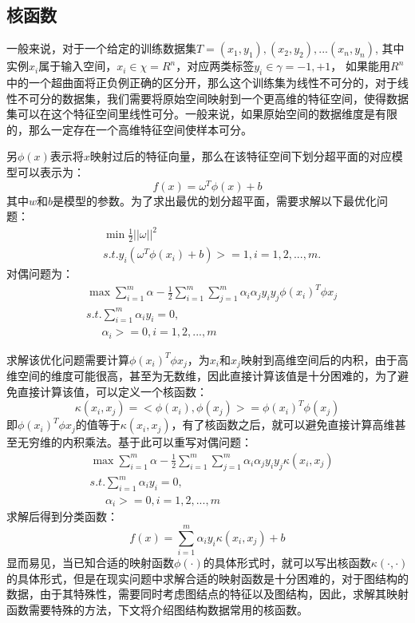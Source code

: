 \subsection{核函数}
\par 一般来说，对于一个给定的训练数据集$T={(x_1, y_1), (x_2, y_2), ...(x_n, y_n)}$, 其中实例$x_i$属于输入空间，$x_i\in \chi=R^n$，对应两类标签$y_i\in \gamma={-1, +1}$， 如果能用$R^n$中的一个超曲面将正负例正确的区分开，那么这个训练集为线性不可分的，对于线性不可分的数据集，我们需要将原始空间映射到一个更高维的特征空间，使得数据集可以在这个特征空间里线性可分。一般来说，如果原始空间的数据维度是有限的，那么一定存在一个高维特征空间使样本可分。
\par 另$\phi(x)$表示将$x$映射过后的特征向量，那么在该特征空间下划分超平面的对应模型可以表示为：
$$f(x)=\omega^T\phi(x)+b$$
其中$w$和$b$是模型的参数。为了求出最优的划分超平面，需要求解以下最优化问题：
\begin{align}
&\min \frac{1}{2} ||\omega||^2 \\
&s.t. y_i(\omega^T\phi(x_i)+b)>=1, i=1,2,...,m.
\end{align}
对偶问题为：
\begin{align}
&\max \sum_{i=1}^{m} \alpha - \frac{1}{2}\sum_{i=1}^{m}\sum_{j=1}^{m} \alpha_i\alpha_jy_iy_j\phi(x_i)^T\phi{x_j}\\
&s.t. \sum_{i=1}^m \alpha_i y_i = 0,\\
&\phantom {s.t.}\alpha_i >=0,  i=1,2,...,m
\end{align}
\par 	求解该优化问题需要计算$\phi(x_i)^T\phi{x_j}$，为$x_i$和$x_j$映射到高维空间后的内积，由于高维空间的维度可能很高，甚至为无数维，因此直接计算该值是十分困难的，为了避免直接计算该值，可以定义一个核函数：
\begin{equation}
\kappa(x_i, x_j) = <\phi(x_i), \phi(x_j)> = \phi(x_i)^T\phi(x_j)
\end{equation}
即$\phi(x_i)^T\phi{x_j}$的值等于$\kappa(x_i, x_j) $，有了核函数之后，就可以避免直接计算高维甚至无穷维的内积乘法。基于此可以重写对偶问题：
\begin{align}
&\max \sum_{i=1}^{m} \alpha - \frac{1}{2}\sum_{i=1}^{m}\sum_{j=1}^{m} \alpha_i\alpha_jy_iy_j\kappa(x_i, x_j) \\
&s.t. \sum_{i=1}^m \alpha_i y_i = 0,\\
&\phantom {s.t.}\alpha_i >=0,  i=1,2,...,m
\end{align}
求解后得到分类函数：
\begin{equation}
f(x)=\sum_{i=1}^m \alpha_iy_i \kappa(x_i, x_j) +b
\end{equation}
显而易见，当已知合适的映射函数$\phi(\cdot)$的具体形式时，就可以写出核函数$\kappa(\cdot, \cdot)$的具体形式，但是在现实问题中求解合适的映射函数是十分困难的，对于图结构的数据，由于其特殊性，需要同时考虑图结点的特征以及图结构，因此，求解其映射函数需要特殊的方法，下文将介绍图结构数据常用的核函数。
